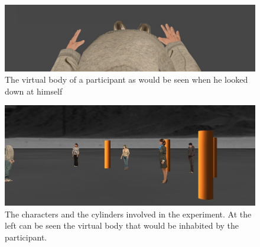 \documentclass[
		twoside,openright,titlepage,numbers=noenddot,manychapters,
		headinclude,%
                footinclude=false,cleardoublepage=empty,
                BCOR=5mm,
		fontsize=11pt, %
                 enabledeprecatedfontcommands]{scrreprt}
\begin{document}
\begin{figure}[]

\begin{center}

\includegraphics[width=12cm]{figures/proxemics/me.jpg}

\caption{The virtual body of a participant as would be seen when he looked down at himself}
\label{fig_me}

\end{center}

\end{figure} 


\begin{figure}[]
\begin{center}
\includegraphics[width=12cm]{figures/proxemics/environment.jpg}
\caption{ The characters and the cylinders involved in the experiment. At the left can be seen the virtual body that would be inhabited by the participant.}
\label{fig_environment}
\end{center}
\end{figure} 
\end{document}
